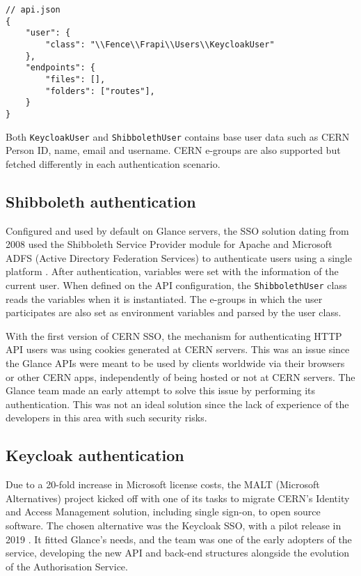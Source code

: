 \begin{lstlisting}[caption={Example of API configuration file using Keycloak authentication.}]
// api.json
{
    "user": {
        "class": "\\Fence\\Frapi\\Users\\KeycloakUser"
    },
    "endpoints": {
        "files": [],
        "folders": ["routes"],
    }
}
\end{lstlisting}

Both \texttt{KeycloakUser} and \texttt{ShibbolethUser} contains base user data such as CERN Person ID, name, email and username. CERN e-groups are also supported but fetched differently in each authentication scenario.

\subsection{Shibboleth authentication}

Configured and used by default on Glance servers, the SSO solution dating from 2008 used the Shibboleth Service Provider module for Apache and Microsoft ADFS (Active Directory Federation Services) to authenticate users using a single platform \cite{shibboleth-article}. After authentication, variables were set with the information of the current user. When defined on the API configuration, the \texttt{ShibbolethUser} class reads the variables when it is instantiated. The e-groups in which the user participates are also set as environment variables and parsed by the user class.

With the first version of CERN SSO, the mechanism for authenticating HTTP API users was using cookies generated at CERN servers. This was an issue since the Glance APIs were meant to be used by clients worldwide via their browsers or other CERN apps, independently of being hosted or not at CERN servers. The Glance team made an early attempt to solve this issue by performing its authentication. This was not an ideal solution since the lack of experience of the developers in this area with such security risks.

\subsection{Keycloak authentication}

Due to a 20-fold increase in Microsoft license costs, the MALT (Microsoft Alternatives) \cite{malt} \cite{malt-internal} \cite{malt-auth} project kicked off with one of its tasks to migrate CERN's Identity and Access Management solution, including single sign-on, to open source software. The chosen alternative was the Keycloak SSO, with a pilot release in 2019 \cite{keycloak-article}. It fitted Glance's needs, and the team was one of the early adopters of the service, developing the new API and back-end structures alongside the evolution of the Authorisation Service.

